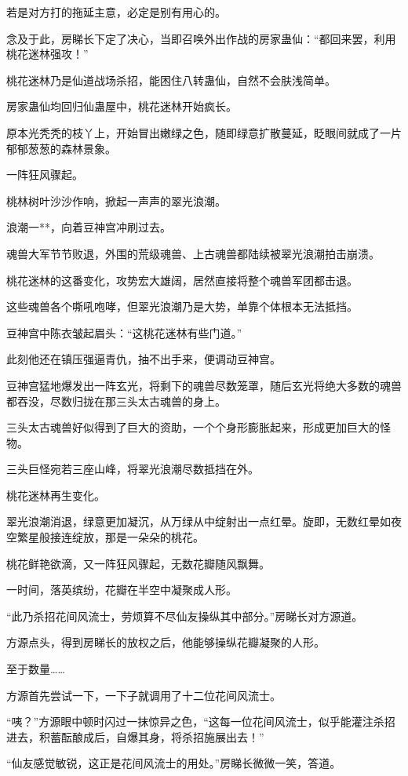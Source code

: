 \begin{this_body}
若是对方打的拖延主意，必定是别有用心的。

念及于此，房睇长下定了决心，当即召唤外出作战的房家蛊仙：“都回来罢，利用桃花迷林强攻！”

桃花迷林乃是仙道战场杀招，能困住八转蛊仙，自然不会肤浅简单。

房家蛊仙均回归仙蛊屋中，桃花迷林开始疯长。

原本光秃秃的枝丫上，开始冒出嫩绿之色，随即绿意扩散蔓延，眨眼间就成了一片郁郁葱葱的森林景象。

一阵狂风骤起。

桃林树叶沙沙作响，掀起一声声的翠光浪潮。

浪潮一**，向着豆神宫冲刷过去。

魂兽大军节节败退，外围的荒级魂兽、上古魂兽都陆续被翠光浪潮拍击崩溃。

桃花迷林的这番变化，攻势宏大雄阔，居然直接将整个魂兽军团都击退。

这些魂兽各个嘶吼咆哮，但翠光浪潮乃是大势，单靠个体根本无法抵挡。

豆神宫中陈衣皱起眉头：“这桃花迷林有些门道。”

此刻他还在镇压强逼青仇，抽不出手来，便调动豆神宫。

豆神宫猛地爆发出一阵玄光，将剩下的魂兽尽数笼罩，随后玄光将绝大多数的魂兽都吞没，尽数归拢在那三头太古魂兽的身上。

三头太古魂兽好似得到了巨大的资助，一个个身形膨胀起来，形成更加巨大的怪物。

三头巨怪宛若三座山峰，将翠光浪潮尽数抵挡在外。

桃花迷林再生变化。

翠光浪潮消退，绿意更加凝沉，从万绿从中绽射出一点红晕。旋即，无数红晕如夜空繁星般接连绽放，那是一朵朵的桃花。

桃花鲜艳欲滴，又一阵狂风骤起，无数花瓣随风飘舞。

一时间，落英缤纷，花瓣在半空中凝聚成人形。

“此乃杀招花间风流士，劳烦算不尽仙友操纵其中部分。”房睇长对方源道。

方源点头，得到房睇长的放权之后，他能够操纵花瓣凝聚的人形。

至于数量……

方源首先尝试一下，一下子就调用了十二位花间风流士。

“咦？”方源眼中顿时闪过一抹惊异之色，“这每一位花间风流士，似乎能灌注杀招进去，积蓄酝酿成后，自爆其身，将杀招施展出去！”

“仙友感觉敏锐，这正是花间风流士的用处。”房睇长微微一笑，答道。


\end{this_body}
